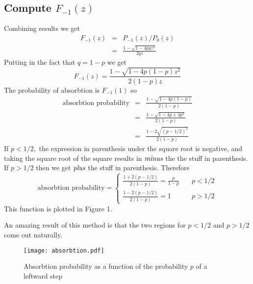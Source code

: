 \documentclass{article}
\begin{document}
\subsection{Compute $F_{-1}(z)$}

Combining results we get\begin{eqnarray*}
F_{-1}(z) & = & P_{-1}(z)/P_{0}(z)\\
 & = & \frac{1-\sqrt{1-4pqz^{2}}}{2qz}\end{eqnarray*}
Putting in the fact that $q=1-p$ we get \begin{equation}
F_{-1}(z)=\frac{1-\sqrt{1-4p(1-p)z^{2}}}{2(1-p)z} \end{equation}
The probability of absorbtion is $F_{-1}(1)$ so\begin{eqnarray*}
\textrm{absorbtion probability} & = & \frac{1-\sqrt{1-4p(1-p)}}{2(1-p)}\\
 & = & \frac{1-\sqrt{1-4p+4p^{2}}}{2(1-p)}\\
 & = & \frac{1-2\sqrt{(p-1/2)^{2}}}{2(1-p)}\end{eqnarray*}
If $p<1/2,$ the expression in parenthesis under the square root is negative, and taking the square root of the square results in $\emph{minus}$ the the stuff in parenthesis. If $p>1/2$ then we get $\emph{plus}$ the stuff in parenthesis. Therefore \begin{equation}
\textrm{absorbtion probability}=\begin{cases}
\frac{1+2(p-1/2)}{2(1-p)}=\frac{p}{1-p} & \quad p<1/2\\
\frac{1-2(p-1/2)}{2(1-p)}=1 & \quad p>1/2\end{cases} \end{equation}
This function is plotted in Figure 1.

An amazing result of this method is that the two regions for $p<1/2$ and $p>1/2$ come out naturally.

\begin{figure}
\begin{centering}
\texttt{[image: absorbtion.pdf]}
\par\end{centering}
\caption{Absorbtion probability as a function of the probability $p$ of a
leftward step}
\end{figure}
\end{document}
